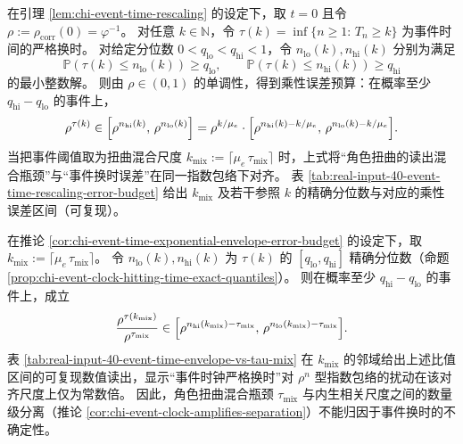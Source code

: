 \begin{remark}
\label{cor:chi-event-time-exponential-envelope-error-budget}
在引理 \ref{lem:chi-event-time-rescaling} 的设定下，取 $t=0$ 且令 $\rho:=\rho_{\mathrm{corr}}(0)=\varphi^{-1}$。
对任意 $k\in\mathbb{N}$，令 $\tau(k)=\inf\{n\ge 1:\,T_n\ge k\}$ 为事件时间的严格换时。
对给定分位数 $0<q_{\mathrm{lo}}<q_{\mathrm{hi}}<1$，令 $n_{\mathrm{lo}}(k),n_{\mathrm{hi}}(k)$ 分别为满足
$$
\mathbb{P}(\tau(k)\le n_{\mathrm{lo}}(k))\ge q_{\mathrm{lo}},
\qquad
\mathbb{P}(\tau(k)\le n_{\mathrm{hi}}(k))\ge q_{\mathrm{hi}}
$$
的最小整数解。
则由 $\rho\in(0,1)$ 的单调性，得到乘性误差预算：在概率至少 $q_{\mathrm{hi}}-q_{\mathrm{lo}}$ 的事件上，
$$
\rho^{\tau(k)}\in\Bigl[\rho^{n_{\mathrm{hi}}(k)},\,\rho^{n_{\mathrm{lo}}(k)}\Bigr]
=\rho^{k/\mu_e}\cdot\Bigl[\rho^{n_{\mathrm{hi}}(k)-k/\mu_e},\,\rho^{n_{\mathrm{lo}}(k)-k/\mu_e}\Bigr].
$$
当把事件阈值取为扭曲混合尺度 $k_{\mathrm{mix}}:=\lceil\mu_e\,\tau_{\mathrm{mix}}\rceil$ 时，上式将“角色扭曲的读出混合瓶颈”与“事件换时误差”在同一指数包络下对齐。
表 \ref{tab:real-input-40-event-time-rescaling-error-budget} 给出 $k_{\mathrm{mix}}$ 及若干参照 $k$ 的精确分位数与对应的乘性误差区间（可复现）。
\end{remark}



\begin{remark}
\label{cor:chi-event-time-envelope-vs-tau-mix}
在推论 \ref{cor:chi-event-time-exponential-envelope-error-budget} 的设定下，取 $k_{\mathrm{mix}}:=\lceil \mu_e\,\tau_{\mathrm{mix}}\rceil$。
令 $n_{\mathrm{lo}}(k),n_{\mathrm{hi}}(k)$ 为 $\tau(k)$ 的 $[q_{\mathrm{lo}},q_{\mathrm{hi}}]$ 精确分位数（命题 \ref{prop:chi-event-clock-hitting-time-exact-quantiles}）。
则在概率至少 $q_{\mathrm{hi}}-q_{\mathrm{lo}}$ 的事件上，成立
$$
\frac{\rho^{\tau(k_{\mathrm{mix}})}}{\rho^{\tau_{\mathrm{mix}}}}
\in\Bigl[\rho^{n_{\mathrm{hi}}(k_{\mathrm{mix}})-\tau_{\mathrm{mix}}},\,\rho^{n_{\mathrm{lo}}(k_{\mathrm{mix}})-\tau_{\mathrm{mix}}}\Bigr].
$$
表 \ref{tab:real-input-40-event-time-envelope-vs-tau-mix} 在 $k_{\mathrm{mix}}$ 的邻域给出上述比值区间的可复现数值读出，显示“事件时钟严格换时”对 $\rho^n$ 型指数包络的扰动在该对齐尺度上仅为常数倍。
因此，角色扭曲混合瓶颈 $\tau_{\mathrm{mix}}$ 与内生相关尺度之间的数量级分离（推论 \ref{cor:chi-event-clock-amplifies-separation}）不能归因于事件换时的不确定性。
\end{remark}

